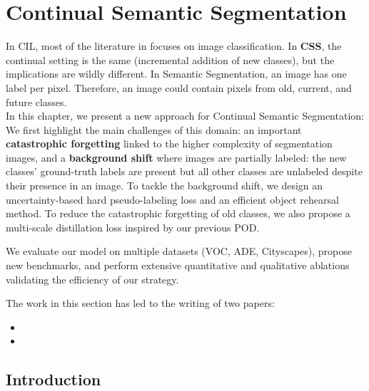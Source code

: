 \chapter{Continual Semantic Segmentation}
\label{chapter:segmentation}

\begin{chapabstract}
    In \acf{CIL},  most of the literature in focuses on image classification. In \textbf{\acf{CSS}},
    the continual setting is the same (incremental addition of new classes), but the implications
    are wildly different. In Semantic Segmentation, an image has one label per pixel. Therefore, an
    image could contain pixels from old, current, and future classes. \\
    In this chapter, we present a new approach for Continual Semantic Segmentation: We first
    highlight the main challenges of this domain: an important \textbf{catastrophic forgetting}
    linked to the higher complexity of segmentation images, and a \textbf{background shift} where
    images are partially labeled: the new classes' ground-truth labels are present but all other
    classes are unlabeled despite their presence in an image. To tackle the background shift, we
    design an uncertainty-based hard pseudo-labeling loss and an efficient object rehearsal method.
    To reduce the catastrophic forgetting of old classes, we also propose a multi-scale distillation
    loss inspired by our previous POD.

    We evaluate our model on multiple datasets (\eg VOC, ADE, Cityscapes), propose new benchmarks,
    and perform extensive quantitative and qualitative ablations validating the efficiency of our
    strategy.

    The work in this section has led to the writing of two papers:

    \begin{itemize}
        \item {}
        \item {}
    \end{itemize}

\end{chapabstract}
\newpage

\minitoc
{}



\section{Introduction}
\label{sec:seg_intro}

